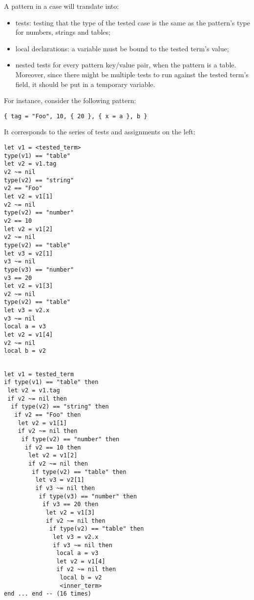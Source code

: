 A pattern in a case will translate into:
\begin{itemize}
\item tests: testing that the type of the tested case is the same as
  the pattern's type for numbers, strings and tables;
\item local declarations: a variable must be bound to the
  tested term's value;
\item nested tests for every pattern key/value pair, when the pattern
  is a table. Moreover, since there might be multiple tests to run
  against the tested term's field, it should be put in a temporary
  variable.
\end{itemize}

For instance, consider the following pattern:

\begin{verbatim}
{ tag = "Foo", 10, { 20 }, { x = a }, b }
\end{verbatim}

It corresponds to the series of tests and assignments on the left:

\begin{minipage}{6cm}
\begin{verbatim}
let v1 = <tested_term>
type(v1) == "table"
let v2 = v1.tag
v2 ~= nil
type(v2) == "string"
v2 == "Foo"
let v2 = v1[1]
v2 ~= nil
type(v2) == "number"
v2 == 10
let v2 = v1[2]
v2 ~= nil
type(v2) == "table"
let v3 = v2[1]
v3 ~= nil
type(v3) == "number"
v3 == 20
let v2 = v1[3]
v2 ~= nil
type(v2) == "table"
let v3 = v2.x
v3 ~= nil
local a = v3
let v2 = v1[4]
v2 ~= nil
local b = v2


\end{verbatim}
\end{minipage}
\begin{minipage}{6cm}
\begin{verbatim}
let v1 = tested_term
if type(v1) == "table" then
 let v2 = v1.tag
 if v2 ~= nil then
  if type(v2) == "string" then
   if v2 == "Foo" then
    let v2 = v1[1]
    if v2 ~= nil then
     if type(v2) == "number" then
      if v2 == 10 then
       let v2 = v1[2]
       if v2 ~= nil then
        if type(v2) == "table" then
         let v3 = v2[1]
         if v3 ~= nil then
          if type(v3) == "number" then
           if v3 == 20 then
            let v2 = v1[3]
            if v2 ~= nil then
             if type(v2) == "table" then
              let v3 = v2.x
              if v3 ~= nil then
               local a = v3
               let v2 = v1[4]
               if v2 ~= nil then
                local b = v2
                <inner_term>
end ... end -- (16 times)
\end{verbatim}
\end{minipage}
~\\~\\

